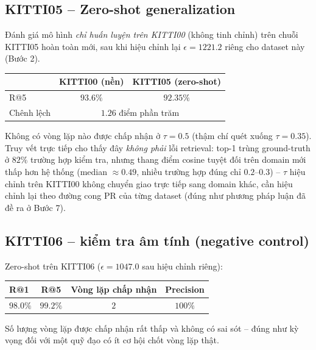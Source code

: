 \documentclass[a4paper,12pt]{article}
\begin{document}
\subsection{KITTI05 -- Zero-shot generalization}
Đánh giá mô hình \emph{chỉ huấn luyện trên KITTI00} (không tinh chỉnh) trên chuỗi KITTI05 hoàn toàn mới, sau khi hiệu chỉnh lại $\epsilon=1221.2$ riêng cho dataset này (Bước 2).
\begin{center}
\begin{tabular}{lcc}
\toprule
& KITTI00 (nền) & KITTI05 (zero-shot) \\
\midrule
R@5 & $93.6\%$ & $92.35\%$ \\
Chênh lệch & \multicolumn{2}{c}{$1.26$ điểm phần trăm} \\
\bottomrule
\end{tabular}
\end{center}
Không có vòng lặp nào được chấp nhận ở $\tau=0.5$ (thậm chí quét xuống $\tau=0.35$). Truy vết trực tiếp cho thấy đây \emph{không phải} lỗi retrieval: top-1 trùng ground-truth ở $82\%$ trường hợp kiểm tra, nhưng thang điểm cosine tuyệt đối trên domain mới thấp hơn hệ thống (median $\approx 0.49$, nhiều trường hợp đúng chỉ $0.2$--$0.3$) -- $\tau$ hiệu chỉnh trên KITTI00 không chuyển giao trực tiếp sang domain khác, cần hiệu chỉnh lại theo đường cong PR của từng dataset (đúng như phương pháp luận đã đề ra ở Bước 7).

\subsection{KITTI06 -- kiểm tra âm tính (negative control)}
Zero-shot trên KITTI06 ($\epsilon=1047.0$ sau hiệu chỉnh riêng):
\begin{center}
\begin{tabular}{lccc}
\toprule
R@1 & R@5 & Vòng lặp chấp nhận & Precision \\
\midrule
$98.0\%$ & $99.2\%$ & $2$ & $100\%$ \\
\bottomrule
\end{tabular}
\end{center}
Số lượng vòng lặp được chấp nhận rất thấp và không có sai sót -- đúng như kỳ vọng đối với một quỹ đạo có ít cơ hội chốt vòng lặp thật.
\end{document}
